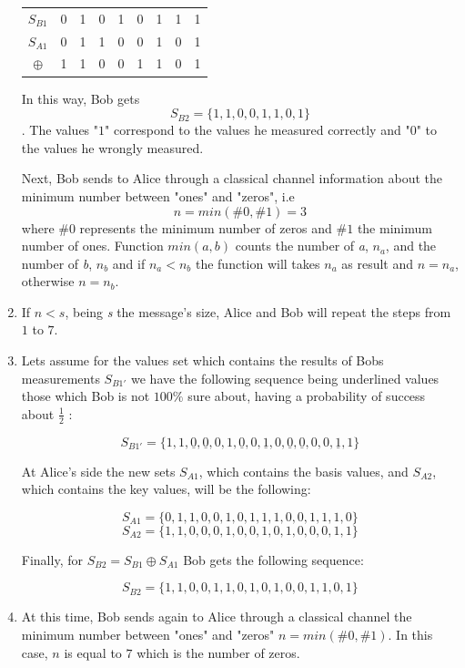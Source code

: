 \begin{enumerate}
  \begin{table}[H]
    \centering
    \begin{tabular}{c|c c c c c c c c}
     $S_{B1}$ & 0 & 1 & 0 & 1 & 0 & 1 & 1 & 1 \\
     $S_{A1}$ & 0 & 1 & 1 & 0 & 0 & 1 & 0 & 1 \\ \hline
     $\oplus$ & 1 & 1 & 0 & 0 & 1 & 1 & 0 & 1
    \end{tabular}
    \end{table}

      In this way, Bob gets $$S_{B2} = \{1,1,0,0,1,1,0,1 \}$$. The values "$1$" correspond to the values he measured correctly and "$0$" to the values he wrongly measured.

       Next, Bob sends to Alice through a classical channel information about the minimum number between "ones" and "zeros", i.e $$n=min(\#0,\#1)=3$$ where $\#0$ represents the minimum number of zeros and $\#1$ the minimum number of ones. Function $min(a,b)$ counts the number of \textit{a}, $n_{a}$, and the number of \textit{b}, $n_{b}$ and if $n_{a}<n_{b}$ the function will takes $n_{a}$ as result and $n=n_{a}$, otherwise $n=n_{b}$.

  \item If $n<s$, being \textit{s} the message's size, Alice and Bob will repeat the steps from $1$ to $7$.

  \item Lets assume for the values set which contains the results of Bobs measurements $S_{B1\prime}$ we have the following sequence being underlined values those which Bob is not $100\%$ sure about, having a probability of success about $\frac{1}{2}$ :

   $$S_{B1\prime}= \{1,1,\underline{0},\underline{0},0,1,\underline{0},0,\underline{1},0,\underline{0},\underline{0},0,0,\underline{1},1 \}$$

    At Alice's side the new sets $S_{A1}$, which contains the basis values, and $S_{A2}$, which contains the key values, will be the following:

    $$S_{A1}=\{0,1,1,0,0,1,0,1,1,1,0,0,1,1,1,0 \}$$ $$S_{A2}=\{1,1,0,0,0,1,0,0,1,0,1,0,0,0,1,1 \}$$

    Finally, for $S_{B2}=S_{B1} \oplus S_{A1}$ Bob gets the following sequence:

    $$S_{B2}= \{1,1,0,0,1,1,0,1,0,1,0,0,1,1,0,1 \}$$

  \item At this time, Bob sends again to Alice through a classical channel the minimum number between "ones" and "zeros" $n=min(\#0,\#1)$. In this case, $n$ is equal to $7$ which is the number of zeros.


\end{enumerate}
